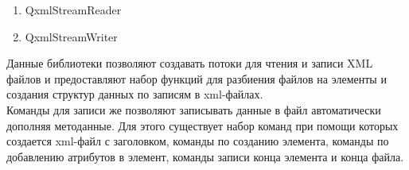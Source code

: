 \begin{enumerate}
\item QxmlStreamReader
\item QxmlStreamWriter
\end{enumerate}

Данные библиотеки позволяют создавать потоки для чтения и записи XML файлов и предоставляют набор функций для разбиения файлов на элементы и создания структур данных по записям в xml-файлах. \\

Команды для записи же позволяют записывать данные в файл автоматически дополняя методанные. Для этого существует набор команд при помощи которых создается xml-файл с заголовком, команды по созданию элемента, команды по добавлению атрибутов в элемент, команды записи конца элемента и конца файла. \\


